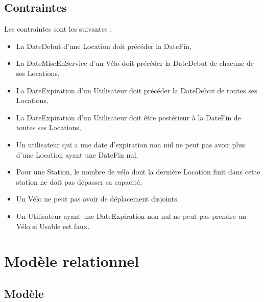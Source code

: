\documentclass[a4paper,10pt]{article}
\begin{document}
\subsection{Contraintes}
Les contraintes sont les suivantes :
\begin{itemize}
  \item La DateDebut d'une Location doit précéder la DateFin, 
  \item La DateMiseEnService d'un Vélo doit précéder la DateDebut de chacune de ses Locations,
  \item La DateExpiration d'un Utilisateur doit précéder la DateDebut de toutes ses Locations,
  \item La DateExpiration d'un Utilisateur doit \^etre postérieur à la DateFin de toutes ses Locations,
  \item Un utilisateur qui a une date d'expiration non nul ne peut pas avoir plus d'une Location ayant une DateFin nul,
  \item Pour une Station, le nombre de vélo dont la dernière Location finit  dans cette station ne doit pas dépasser sa capacité,
  \item Un Vélo ne peut pas avoir de déplacement disjoints.
  \item Un Utilisateur ayant une DateExpiration non nul ne peut pas prendre un Vélo si Usable est faux.
\end{itemize}



\section{Modèle relationnel}
\subsection{Modèle}
\end{document}
